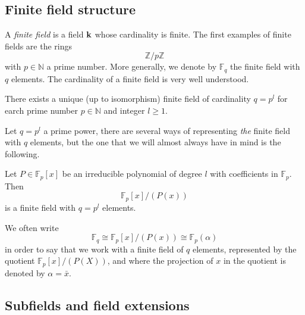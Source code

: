 \subsection{Finite field structure}

A \emph{finite field} is a field $\mathbf{k}$ whose cardinality is finite. The first
examples of finite fields are the rings 
\[
  \mathbb{Z}/p\mathbb{Z}
\]
with $p\in\mathbb{N}$ a prime number. More generally, we denote by
$\mathbb{F}_{q}$ the finite field with $q$ elements. The cardinality of a finite
field is very well understood.
\begin{prop}
 There exists a unique (up to isomorphism) finite field of cardinality $q = p^l$
 for earch prime number $p\in\mathbb{N}$ and integer $l\geq1$.
\end{prop}
Let $q=p^l$ a prime power, there are several ways of representing
\emph{the} finite field with $q$ elements, but the one that we will almost
always have in mind is the following.

\begin{prop}
Let $P\in\mathbb{F}_p[x]$ be an
irreducible polynomial of degree $l$ with coefficients in $\mathbb{F}_p$. Then
\[
  \mathbb{F}_p[x]/(P(x))
\]
is a finite field with $q = p^l$ elements.
\end{prop}
We often write
\[
  \mathbb{F}_q \cong \mathbb{F}_{p}[x]/(P(x))\cong \mathbb{F}_p(\alpha)
\]
in order to say that we work with a finite field of $q$ elements, represented by
the quotient $\mathbb{F}_{p}[x]/(P(X))$, and where the projection of $x$ in the
quotient is denoted by $\alpha=\bar x$.

\subsection{Subfields and field extensions}

